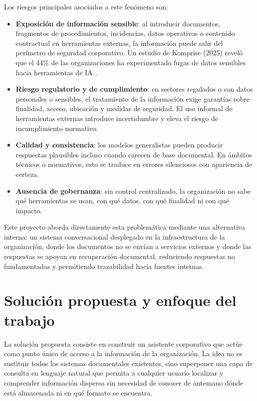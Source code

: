 Los riesgos principales asociados a este fenómeno son:

\begin{itemize}
    \item \textbf{Exposición de información sensible}: al introducir documentos, fragmentos de procedimientos, incidencias, datos operativos o contenido contractual en herramientas externas, la información puede salir del perímetro de seguridad corporativo. Un estudio de Komprise (2025) reveló que el 44\% de las organizaciones ha experimentado fugas de datos sensibles hacia herramientas de IA \cite{komprise2025survey}.
    \item \textbf{Riesgo regulatorio y de cumplimiento}: en sectores regulados o con datos personales o sensibles, el tratamiento de la información exige garantías sobre finalidad, acceso, ubicación y medidas de seguridad. El uso informal de herramientas externas introduce incertidumbre y eleva el riesgo de incumplimiento normativo.
    \item \textbf{Calidad y consistencia}: los modelos generalistas pueden producir respuestas plausibles incluso cuando carecen de base documental. En ámbitos técnicos o normativos, esto se traduce en errores silenciosos con apariencia de certeza.
    \item \textbf{Ausencia de gobernanza}: sin control centralizado, la organización no sabe qué herramientas se usan, con qué datos, con qué finalidad ni con qué impacto.
\end{itemize}

Este proyecto aborda directamente esta problemática mediante una alternativa interna: un sistema conversacional desplegado en la infraestructura de la organización, donde los documentos no se envían a servicios externos y donde las respuestas se apoyan en recuperación documental, reduciendo respuestas no fundamentadas y permitiendo trazabilidad hacia fuentes internas.

\section{Solución propuesta y enfoque del trabajo}
\label{sec:solucion}

La solución propuesta consiste en construir un asistente corporativo que actúe como punto único de acceso a la información de la organización. La idea no es sustituir todos los sistemas documentales existentes, sino superponer una capa de consulta en lenguaje natural que permita a cualquier usuario localizar y comprender información dispersa sin necesidad de conocer de antemano dónde está almacenada ni en qué formato se encuentra.

